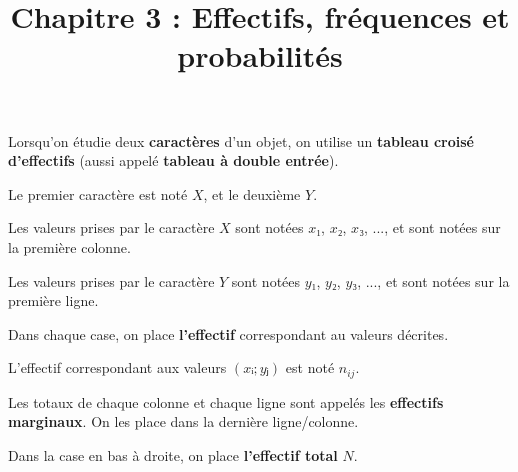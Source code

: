 \documentclass[
	classe=$1^{ere} STI2D$,
	headerTitle=Cours\space Chapitre\space 3
]{coursclass}
\title{Chapitre 3 : Effectifs, fréquences et probabilités}
\date{}
\author{}
\begin{document}
\maketitle

\begin{definition}
	Lorsqu'on étudie deux \textbf{caractères} d'un objet, on utilise un \textbf{tableau croisé d'effectifs} (aussi appelé \textbf{tableau à double entrée}).

	Le premier caractère est noté $X$, et le deuxième $Y$. \medskip

	Les valeurs prises par le caractère $X$ sont notées $x₁$, $x₂$, $x₃$, ..., et sont notées sur la première colonne.

	Les valeurs prises par le caractère $Y$ sont notées $y₁$, $y₂$, $y₃$, ..., et sont notées sur la première ligne. \medskip

	Dans chaque case, on place \textbf{l'effectif} correspondant au valeurs décrites.

	L'effectif correspondant aux valeurs $(xᵢ ; yⱼ)$ est noté $n_{ij}$.

	Les totaux de chaque colonne et chaque ligne sont appelés les \textbf{effectifs marginaux}. On les place dans la dernière ligne/colonne.

	Dans la case en bas à droite, on place \textbf{l'effectif total} $N$.
\end{definition}
\end{document}
